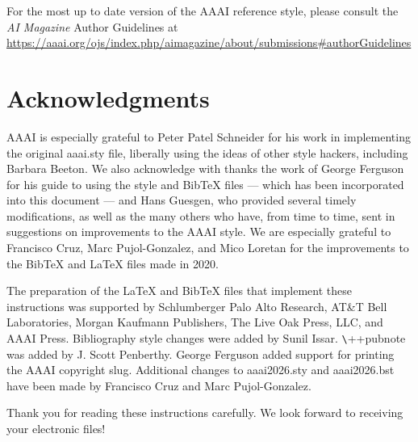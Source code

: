 \vspace{.2em}

For the most up to date version of the AAAI reference style, please
consult the \textit{AI Magazine} Author Guidelines at
\url{https://aaai.org/ojs/index.php/aimagazine/about/submissions#authorGuidelines}

\section{Acknowledgments}

AAAI is especially grateful to Peter Patel Schneider for his work in
implementing the original aaai.sty file, liberally using the ideas of
other style hackers, including Barbara Beeton. We also acknowledge with
thanks the work of George Ferguson for his guide to using the style and
BibTeX files --- which has been incorporated into this document --- and
Hans Guesgen, who provided several timely modifications, as well as the
many others who have, from time to time, sent in suggestions on
improvements to the AAAI style. We are especially grateful to Francisco
Cruz, Marc Pujol-Gonzalez, and Mico Loretan for the improvements to the
Bib\TeX{} and \LaTeX{} files made in 2020.

The preparation of the \LaTeX{} and Bib\TeX{} files that implement these
instructions was supported by Schlumberger Palo Alto Research, AT\&T
Bell Laboratories, Morgan Kaufmann Publishers, The Live Oak Press, LLC,
and AAAI Press. Bibliography style changes were added by Sunil Issar.
\verb+\+++pubnote was added by J. Scott Penberthy. George Ferguson added
support for printing the AAAI copyright slug. Additional changes to
aaai2026.sty and aaai2026.bst have been made by Francisco Cruz and Marc
Pujol-Gonzalez.

\bigskip

\noindent Thank you for reading these instructions carefully. We look
forward to receiving your electronic files!



